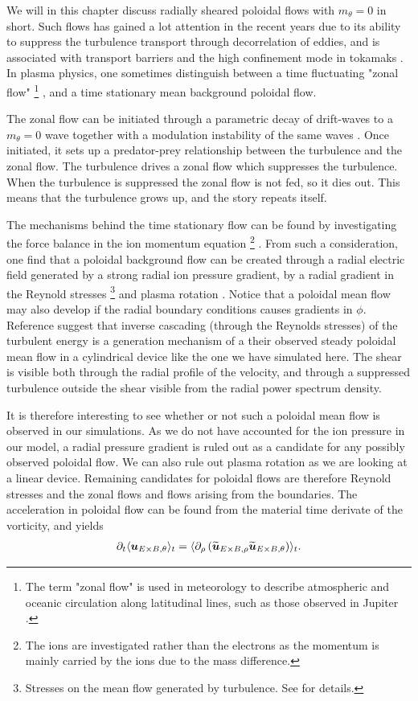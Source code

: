 We will in this chapter discuss radially sheared poloidal flows with $m_\theta = 0$ in short.
Such flows has gained a lot attention in the recent years due to its ability to suppress the turbulence transport through decorrelation of eddies, and is associated with transport barriers and the high confinement mode in tokamaks \cite{Terry2000,Diamond2005a,Viezzer2012Phd}.
In plasma physics, one sometimes distinguish between a time fluctuating "zonal flow"%
\footnote{The term "zonal flow" is used in meteorology to describe atmospheric and oceanic circulation along latitudinal lines, such as those observed in Jupiter \cite{Limaye1986}.}%
, and a time stationary mean background poloidal flow.

The zonal flow can be initiated through a parametric decay of drift-waves to a $m_\theta=0$ wave together with a modulation instability of the same waves \cite{Diamond2005a}.
Once initiated, it sets up a predator-prey relationship between the turbulence and the zonal flow.
The turbulence drives a zonal flow which suppresses the turbulence.
When the turbulence is suppressed the zonal flow is not fed, so it dies out.
This means that the turbulence grows up, and the story repeats itself.

The mechanisms behind the time stationary flow can be found by investigating the force balance in the ion momentum equation%
\footnote{The ions are investigated rather than the electrons as the momentum is mainly carried by the ions due to the mass difference.}%
%
.
From such a consideration, one find that a poloidal background flow can be created through a radial electric field generated by a strong radial ion pressure gradient, by a radial gradient in the Reynold stresses
\footnote{Stresses on the mean flow generated by turbulence.
See \cite{Kundu2010book} for details.}%
and plasma rotation \cite{Terry2000}.
Notice that a poloidal mean flow may also develop if the radial boundary conditions causes gradients in $\phi$.
Reference \cite{Tynan2006a} suggest that inverse cascading (through the Reynolds stresses) of the turbulent energy is a generation mechanism of a their observed steady poloidal mean flow in a cylindrical device like the one we have simulated here.
The shear is visible both through the radial profile of the velocity, and through a suppressed turbulence outside the shear visible from the radial power spectrum density.

It is therefore interesting to see whether or not such a poloidal mean flow is observed in our simulations.
As we do not have accounted for the ion pressure in our model, a radial pressure gradient is ruled out as a candidate for any possibly observed poloidal flow.
We can also rule out plasma rotation as we are looking at a linear device.
Remaining candidates for poloidal flows are therefore Reynold stresses and the zonal flows and flows arising from the boundaries.
The acceleration in poloidal flow can be found from the material time derivate of the vorticity, and yields \cite{Diamond1991}
%
\begin{align*}
    \partial_t \langle{\boldsymbol{u}_{E\times B,\theta}}\rangle_t = \langle{\partial_\rho\left(\widetilde{ \boldsymbol{u}}_{E\times B,\rho}\widetilde{ \boldsymbol{u}}_{E\times B,\theta}\right)}\rangle_t.
\end{align*}
%

